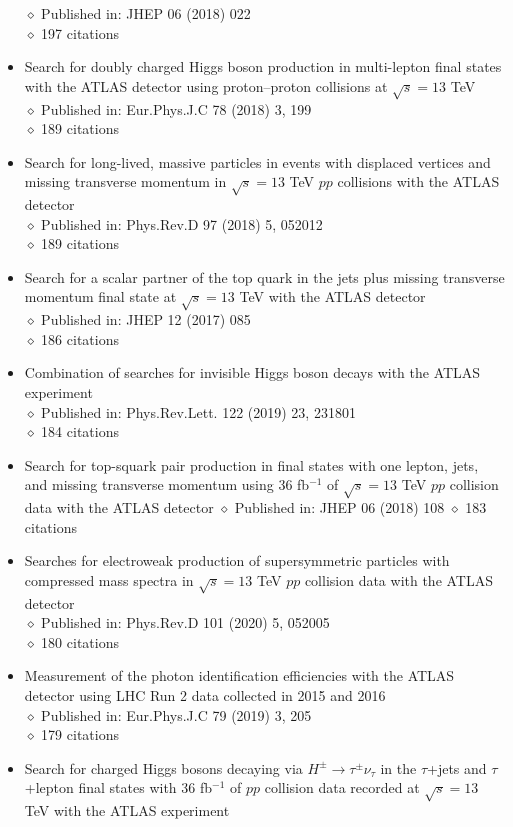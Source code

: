 \documentclass[margin, 10pt]{res} %
\begin{document}
\begin{resume}
\begin{itemize}
$\diamond$ Published in: JHEP 06 (2018) 022\\
$\diamond$ 197 citations
\item Search for doubly charged Higgs boson production in multi-lepton final states with the ATLAS detector using proton–proton collisions at $\sqrt{s} = 13$ TeV\\
$\diamond$ Published in: Eur.Phys.J.C 78 (2018) 3, 199\\
$\diamond$ 189 citations
\item Search for long-lived, massive particles in events with displaced vertices and missing transverse momentum in $\sqrt{s} = 13$ TeV $pp$ collisions with the ATLAS detector\\
$\diamond$ Published in: Phys.Rev.D 97 (2018) 5, 052012\\
$\diamond$ 189 citations
\item Search for a scalar partner of the top quark in the jets plus missing transverse momentum final state at $\sqrt{s} = 13$ TeV with the ATLAS detector\\
$\diamond$ Published in: JHEP 12 (2017) 085\\
$\diamond$ 186 citations
\item Combination of searches for invisible Higgs boson decays with the ATLAS experiment\\
$\diamond$ Published in: Phys.Rev.Lett. 122 (2019) 23, 231801\\
$\diamond$ 184 citations
\item Search for top-squark pair production in final states with one lepton, jets, and missing transverse momentum using 36 fb$^{-1}$ of $\sqrt{s} = 13$ TeV $pp$ collision data with the ATLAS detector
$\diamond$ Published in: JHEP 06 (2018) 108
$\diamond$ 183 citations
\item Searches for electroweak production of supersymmetric particles with compressed mass spectra in $\sqrt{s} = 13$ TeV $pp$ collision data with the ATLAS detector\\
$\diamond$ Published in: Phys.Rev.D 101 (2020) 5, 052005\\
$\diamond$ 180 citations
\item Measurement of the photon identification efficiencies with the ATLAS detector using LHC Run 2 data collected in 2015 and 2016\\
$\diamond$ Published in: Eur.Phys.J.C 79 (2019) 3, 205\\
$\diamond$ 179 citations
\item Search for charged Higgs bosons decaying via $H^{\pm} \rightarrow \tau^{\pm}\nu_{\tau}$ in the $\tau$+jets and $\tau$+lepton final states with 36 fb$^{-1}$ of $pp$ collision data recorded at $\sqrt{s} = 13$ TeV with the ATLAS experiment\\

\end{itemize}
\end{resume}
\end{document}
